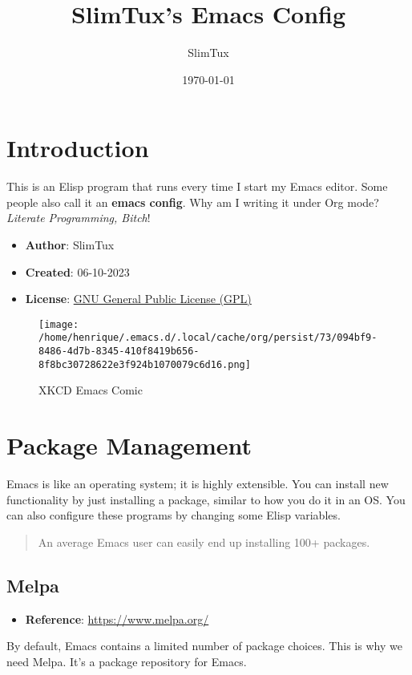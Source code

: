 \documentclass[11pt]{article}
\author{SlimTux}
\date{\today}
\title{SlimTux's Emacs Config}
\begin{document}
\maketitle
\tableofcontents

\section{Introduction}
\label{sec:orgd44a427}
This is an Elisp program that runs every time I start my Emacs editor. Some people also call it an \textbf{emacs config}. Why am I writing it under Org mode? \emph{Literate Programming, Bitch}!

\begin{itemize}
\item \textbf{Author}: SlimTux
\item \textbf{Created}: 06-10-2023
\item \textbf{License}: \href{./LICENSE}{GNU General Public License (GPL)}
\end{itemize}

\begin{figure}[htbp]
\centering
\texttt{[image: /home/henrique/.emacs.d/.local/cache/org/persist/73/094bf9-8486-4d7b-8345-410f8419b656-8f8bc30728622e3f924b1070079c6d16.png]}
\caption{\label{fig:Emacs meme}XKCD Emacs Comic}
\end{figure}
\section{Package Management}
\label{sec:orgc410163}
Emacs is like an operating system; it is highly extensible. You can install new functionality by just installing a package, similar to how you do it in an OS. You can also configure these programs by changing some Elisp variables.

\begin{verse}
An average Emacs user can easily end up installing 100+ packages.\\[0pt]
\end{verse}
\subsection{Melpa}
\label{sec:org6596569}
\begin{itemize}
\item \textbf{Reference}: \url{https://www.melpa.org/}
\end{itemize}

By default, Emacs contains a limited number of package choices. This is why we need Melpa. It's a package repository for Emacs.
\end{document}
